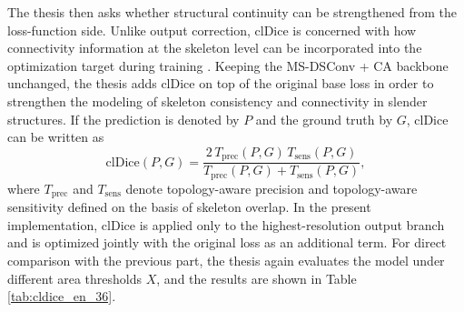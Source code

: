 \documentclass[a4paper,11pt]{article}
\begin{document}
The thesis then asks whether structural continuity can be strengthened from the loss-function side. Unlike output correction, clDice is concerned with how connectivity information at the skeleton level can be incorporated into the optimization target during training \cite{shit2021cldice}. Keeping the MS-DSConv + CA backbone unchanged, the thesis adds clDice on top of the original base loss in order to strengthen the modeling of skeleton consistency and connectivity in slender structures. If the prediction is denoted by \(P\) and the ground truth by \(G\), clDice can be written as
\begin{equation}
\mathrm{clDice}(P,G)=
\frac{2\,T_{\mathrm{prec}}(P,G)\,T_{\mathrm{sens}}(P,G)}
{T_{\mathrm{prec}}(P,G)+T_{\mathrm{sens}}(P,G)},
\end{equation}
where \(T_{\mathrm{prec}}\) and \(T_{\mathrm{sens}}\) denote topology-aware precision and topology-aware sensitivity defined on the basis of skeleton overlap. In the present implementation, clDice is applied only to the highest-resolution output branch and is optimized jointly with the original loss as an additional term. For direct comparison with the previous part, the thesis again evaluates the model under different area thresholds \(X\), and the results are shown in Table \ref{tab:cldice_en_36}.

\begin{table}[!htbp]
\centering
\caption{Results after adding clDice under different post-processing thresholds}
\label{tab:cldice_en_36}
\end{table}
\end{document}
